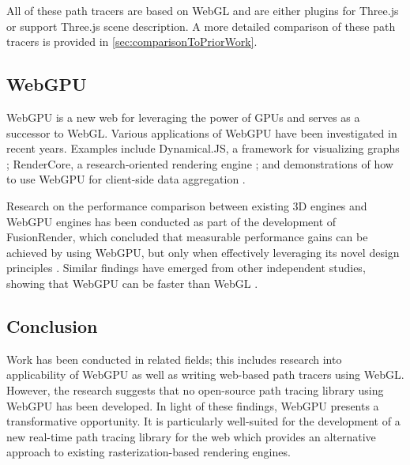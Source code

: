All of these path tracers are based on \gls{WebGL} and are either plugins for \gls{Three.js} or support \gls{Three.js} scene description. A more detailed comparison of these path tracers is provided in \autoref{sec:comparisonToPriorWork}.

\subsection*{WebGPU}

\gls{WebGPU} is a new web  for leveraging the power of \glspl{GPU} and serves as a successor to \gls{WebGL}. Various applications of \gls{WebGPU} have been investigated in recent years. Examples include Dynamical.JS, a framework for visualizing graphs \cite{dotson2022dynamicaljs}; RenderCore, a research-oriented rendering engine \cite{Bohak_Kovalskyi_Linev_Mrak_Tadel_Strban_Tadel_Yagil_2024}; and demonstrations of how to use \gls{WebGPU} for client-side data aggregation \cite{kimmersdorfer2023webgpu}.

Research on the performance comparison between existing 3D engines and \gls{WebGPU} engines has been conducted as part of the development of FusionRender, which concluded that measurable performance gains can be achieved by using \gls{WebGPU}, but only when effectively leveraging its novel design principles \cite{fusionRenderWebGPU}. Similar findings have emerged from other independent studies, showing that \gls{WebGPU} can be faster than \gls{WebGL} \cite{webGPUWebGis, fransson2023performance, CHICKERUR2024919}.

\subsection*{Conclusion}

Work has been conducted in related fields; this includes research into applicability of \gls{WebGPU} as well as writing web-based path tracers using \gls{WebGL}. However, the research suggests that no open-source path tracing library using \gls{WebGPU} has been developed. In light of these findings, \gls{WebGPU} presents a transformative opportunity. It is particularly well-suited for the development of a new real-time path tracing library for the web which provides an alternative approach to existing rasterization-based rendering engines.
